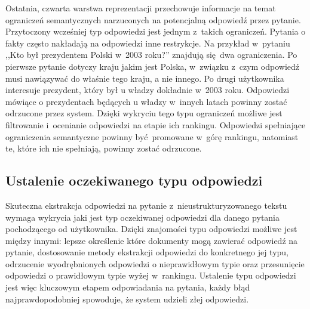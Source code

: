 \documentclass[a4paper, twoside, 12pt]{report}
\begin{document}
            Ostatnia, czwarta warstwa reprezentacji przechowuje informacje na temat ograniczeń semantycznych narzuconych
            na potencjalną odpowiedź przez pytanie. Przytoczony wcześniej typ odpowiedzi jest jednym z~takich ograniczeń.
            Pytania o fakty często nakładają na odpowiedzi inne restrykcje. Na przykład w~pytaniu ,,Kto był prezydentem
            Polski w~2003 roku?'' znajdują się dwa ograniczenia. Po pierwsze pytanie dotyczy kraju jakim jest Polska,
            w~związku z~czym odpowiedź musi nawiązywać do właśnie tego kraju, a nie innego. Po drugi użytkownika
            interesuje prezydent, który był u władzy dokładnie w~2003 roku. Odpowiedzi mówiące o prezydentach będących
            u władzy w~innych latach powinny zostać odrzucone przez system. Dzięki wykryciu tego typu ograniczeń
            możliwe jest filtrowanie i~ocenianie odpowiedzi na etapie ich rankingu. Odpowiedzi spełniające ograniczenia
            semantyczne powinny być promowane w~górę rankingu, natomiast te, które ich nie spełniają, powinny zostać
            odrzucone.

        \subsection{Ustalenie oczekiwanego typu odpowiedzi}
            Skuteczna ekstrakcja odpowiedzi na pytanie z~nieustrukturyzowanego tekstu wymaga wykrycia jaki jest typ
            oczekiwanej odpowiedzi dla danego pytania pochodzącego od użytkownika. Dzięki znajomości typu odpowiedzi
            możliwe jest między innymi: lepsze określenie które dokumenty mogą zawierać odpowiedź na pytanie,
            dostosowanie metody ekstrakcji odpowiedzi do konkretnego jej typu, odrzucenie wyodrębnionych odpowiedzi
            o nieprawidłowym typie oraz przesunięcie odpowiedzi o prawidłowym typie wyżej w~rankingu. Ustalenie typu
            odpowiedzi jest więc kluczowym etapem odpowiadania na pytania, każdy błąd najprawdopodobniej spowoduje,
            że system udzieli złej odpowiedzi.
\end{document}
